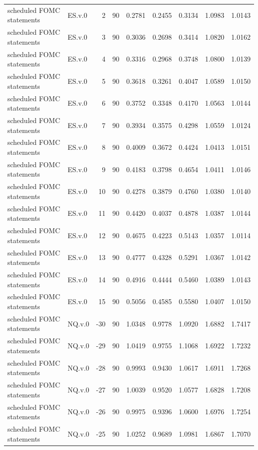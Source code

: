 \begin{tabular}{llrrrrrrr}
scheduled FOMC statements & ES.v.0 & 2 & 90 & 0.2781 & 0.2455 & 0.3134 & 1.0983 & 1.0143 \\
scheduled FOMC statements & ES.v.0 & 3 & 90 & 0.3036 & 0.2698 & 0.3414 & 1.0820 & 1.0162 \\
scheduled FOMC statements & ES.v.0 & 4 & 90 & 0.3316 & 0.2968 & 0.3748 & 1.0800 & 1.0139 \\
scheduled FOMC statements & ES.v.0 & 5 & 90 & 0.3618 & 0.3261 & 0.4047 & 1.0589 & 1.0150 \\
scheduled FOMC statements & ES.v.0 & 6 & 90 & 0.3752 & 0.3348 & 0.4170 & 1.0563 & 1.0144 \\
scheduled FOMC statements & ES.v.0 & 7 & 90 & 0.3934 & 0.3575 & 0.4298 & 1.0559 & 1.0124 \\
scheduled FOMC statements & ES.v.0 & 8 & 90 & 0.4009 & 0.3672 & 0.4424 & 1.0413 & 1.0151 \\
scheduled FOMC statements & ES.v.0 & 9 & 90 & 0.4183 & 0.3798 & 0.4654 & 1.0411 & 1.0146 \\
scheduled FOMC statements & ES.v.0 & 10 & 90 & 0.4278 & 0.3879 & 0.4760 & 1.0380 & 1.0140 \\
scheduled FOMC statements & ES.v.0 & 11 & 90 & 0.4420 & 0.4037 & 0.4878 & 1.0387 & 1.0144 \\
scheduled FOMC statements & ES.v.0 & 12 & 90 & 0.4675 & 0.4223 & 0.5143 & 1.0357 & 1.0114 \\
scheduled FOMC statements & ES.v.0 & 13 & 90 & 0.4777 & 0.4328 & 0.5291 & 1.0367 & 1.0142 \\
scheduled FOMC statements & ES.v.0 & 14 & 90 & 0.4916 & 0.4444 & 0.5460 & 1.0389 & 1.0143 \\
scheduled FOMC statements & ES.v.0 & 15 & 90 & 0.5056 & 0.4585 & 0.5580 & 1.0407 & 1.0150 \\
scheduled FOMC statements & NQ.v.0 & -30 & 90 & 1.0348 & 0.9778 & 1.0920 & 1.6882 & 1.7417 \\
scheduled FOMC statements & NQ.v.0 & -29 & 90 & 1.0419 & 0.9755 & 1.1068 & 1.6922 & 1.7232 \\
scheduled FOMC statements & NQ.v.0 & -28 & 90 & 0.9993 & 0.9430 & 1.0617 & 1.6911 & 1.7268 \\
scheduled FOMC statements & NQ.v.0 & -27 & 90 & 1.0039 & 0.9520 & 1.0577 & 1.6828 & 1.7208 \\
scheduled FOMC statements & NQ.v.0 & -26 & 90 & 0.9975 & 0.9396 & 1.0600 & 1.6976 & 1.7254 \\
scheduled FOMC statements & NQ.v.0 & -25 & 90 & 1.0252 & 0.9689 & 1.0981 & 1.6867 & 1.7070 \\

\end{tabular}
